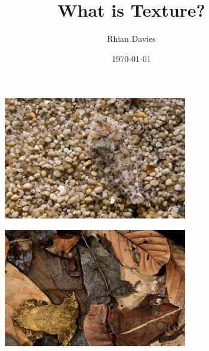 \documentclass{beamer}
\begin{document}
\title{What is Texture?}
\author{Rhian Davies}
\date{\today}

\begin{frame}[plain] 
  \titlepage
\end{frame}

\begin{frame}
\begin{figure}[h]
  \centering
\includegraphics[width = 8cm]{fish}
\end{figure}
\end{frame}

\begin{frame}
\begin{figure}[h]
  \centering
\includegraphics[width = 8cm]{toads}
\end{figure}
\end{frame}
\end{document}
